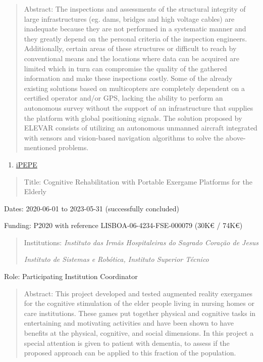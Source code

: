 \begin{quote}
Abstract: The inspections and assessments of the structural integrity of
large infrastructures (eg. dams, bridges and high voltage cables) are
inadequate because they are not performed in a systematic manner and
they greatly depend on the personal criteria of the inspection
engineers. Additionally, certain areas of these structures or difficult
to reach by conventional means and the locations where data can be
acquired are limited which in turn can compromise the quality of the
gathered information and make these inspections costly. Some of the
already existing solutions based on multicopters are completely
dependent on a certified operator and/or GPS, lacking the ability to
perform an autonomous survey without the support of an infrastructure
that supplies the platform with global positioning signals. The solution
proposed by ELEVAR consists of utilizing an autonomous unmanned aircraft
integrated with sensors and vision-based navigation algorithms to solve
the above-mentioned problems.
\end{quote}

\begin{enumerate}
\def\labelenumi{\arabic{enumi}.}
\setcounter{enumi}{2}
\item
  \ul{iPEPE}
\end{enumerate}

\begin{quote}
Title: Cognitive Rehabilitation with Portable Exergame Platforms for the
Elderly
\end{quote}

Dates: 2020-06-01 to 2023-05-31 (successfully concluded)

Funding: P2020 with reference LISBOA-06-4234-FSE-000079 (30K€ / 74K€)

\begin{quote}
Institutions: \emph{Instituto das Irmãs Hospitaleiras do Sagrado Coração
de Jesus}

\emph{Instituto de Sistemas e Robótica, Instituto Superior Técnico}
\end{quote}

Role: Participating Institution Coordinator

\begin{quote}
Abstract: This project developed and tested augmented reality exergames
for the cognitive stimulation of the elder people living in nursing
homes or care institutions. These games put together physical and
cognitive tasks in entertaining and motivating activities and have been
shown to have benefits at the physical, cognitive, and social
dimensions. In this project a special attention is given to patient with
dementia, to assess if the proposed approach can be applied to this
fraction of the population.
\end{quote}

